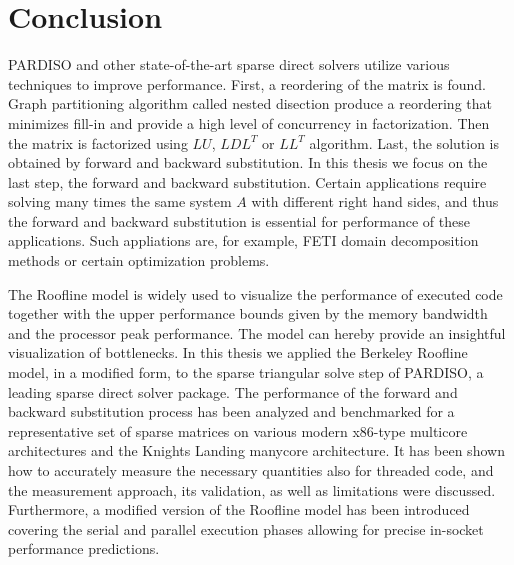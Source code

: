 \chapter{Conclusion}
\label{sec:conclusion}

PARDISO and other state-of-the-art sparse direct solvers utilize various techniques to improve performance. First, a reordering of the matrix is found. Graph partitioning algorithm called nested disection produce a reordering that minimizes fill-in and provide a high level of concurrency in factorization. Then the matrix is factorized using $LU$, $LDL^T$ or $LL^T$ algorithm. Last, the solution is obtained by forward and backward substitution. In this thesis we focus on the last step, the forward and backward substitution. Certain applications require solving many times the same system $A$ with different right hand sides, and thus the forward and backward substitution is essential for performance of these applications. Such appliations are, for example, FETI domain decomposition methods or certain optimization problems.

The Roofline model is widely used to visualize the performance of executed code together with the upper performance bounds given by the memory bandwidth and the processor peak performance. The model can hereby provide an insightful visualization of bottlenecks. In this thesis we applied the Berkeley Roofline model, in a modified form, to the sparse triangular solve step of PARDISO, a leading sparse direct solver package. The performance of the forward and backward substitution process has been analyzed and benchmarked for a representative set of sparse matrices on various modern x86-type multicore architectures and the Knights Landing manycore architecture. It has been shown how to accurately measure the necessary quantities also for threaded code, and the measurement approach, its validation, as well as limitations were discussed. Furthermore, a modified version of the Roofline model has been introduced covering the serial and parallel execution phases allowing for precise in-socket performance predictions.

